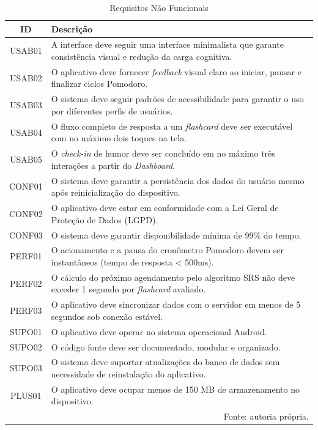 \begin{table}[H]
\centering
\caption{Requisitos Não Funcionais}
\label{tab:requisitosnaofunc}
\begin{tabularx}{\textwidth}{|c|X|}
\hline
\textbf{ID} & \textbf{Descrição} \\
\hline
USAB01 & A interface deve seguir uma interface minimalista que garante consistência visual e redução da carga cognitiva. \\
\hline
USAB02 & O aplicativo deve fornecer \textit{feedback} visual claro ao iniciar, pausar e finalizar ciclos Pomodoro. \\
\hline
USAB03 & O sistema deve seguir padrões de acessibilidade para garantir o uso por diferentes perfis de usuários. \\
\hline
USAB04 & O fluxo completo de resposta a um \textit{flashcard} deve ser executável com no máximo dois toques na tela. \\
\hline
USAB05 & O \textit{check-in} de humor deve ser concluído em no máximo três interações a partir do \textit{Dashboard}. \\
\hline
CONF01 & O sistema deve garantir a persistência dos dados do usuário mesmo após reinicialização do dispositivo. \\
\hline
CONF02 & O aplicativo deve estar em conformidade com a Lei Geral de Proteção de Dados (LGPD). \\
\hline
CONF03 & O sistema deve garantir disponibilidade mínima de 99\% do tempo. \\
\hline
PERF01 & O acionamento e a pausa do cronômetro Pomodoro devem ser instantâneos (tempo de resposta < 500ms). \\
\hline
PERF02 & O cálculo do próximo agendamento pelo algoritmo SRS não deve exceder 1 segundo por \textit{flashcard} avaliado. \\
\hline
PERF03 & O aplicativo deve sincronizar dados com o servidor em menos de 5 segundos sob conexão estável. \\
\hline
SUPO01 & O aplicativo deve operar no sistema operacional Android. \\
\hline
SUPO02 & O código fonte deve ser documentado, modular e organizado. \\
\hline
SUPO03 & O sistema deve suportar atualizações do banco de dados sem necessidade de reinstalação do aplicativo. \\
\hline
PLUS01 & O aplicativo deve ocupar menos de 150 MB de armazenamento no dispositivo. \\
\hline
\multicolumn{2}{r}{\small Fonte: autoria própria.} \\
\end{tabularx}
\end{table}
